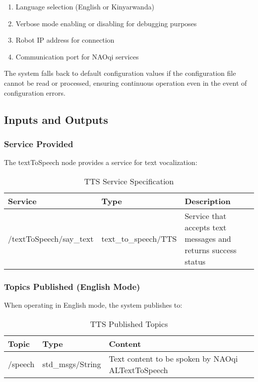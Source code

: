 \documentclass{CSSRforAfrica}
\begin{document}
\begin{enumerate}
    \item Language selection (English or Kinyarwanda)
    \item Verbose mode enabling or disabling for debugging purposes
    \item Robot IP address for connection
    \item Communication port for NAOqi services
\end{enumerate}

The system falls back to default configuration values if the configuration file cannot be read or processed, ensuring continuous operation even in the event of configuration errors.

\subsection{Inputs and Outputs}

\subsubsection{Service Provided}
The textToSpeech node provides a service for text vocalization:

\begin{table}[h]
    \centering
    \begin{tabular}{|p{4cm}|p{4cm}|p{6cm}|}
        \hline
      \rowcolor{lightgray}  \textbf{Service} & \textbf{Type} & \textbf{Description} \\
        \hline
        /textToSpeech/say\_text & text\_to\_speech/TTS & Service that accepts text messages and returns success status \\
        \hline
    \end{tabular}
    \caption{TTS Service Specification}
    \label{tab:tts_service}
\end{table}

\subsubsection{Topics Published (English Mode)}
When operating in English mode, the system publishes to:

\begin{table}[h]
    \centering
    \begin{tabular}{|p{3cm}|p{4cm}|p{7cm}|}
        \hline
      \rowcolor{lightgray}  \textbf{Topic} & \textbf{Type} & \textbf{Content} \\
        \hline
        /speech & std\_msgs/String & Text content to be spoken by NAOqi ALTextToSpeech \\
        \hline
    \end{tabular}
    \caption{TTS Published Topics}
    \label{tab:tts_topics}
\end{table}
\end{document}
